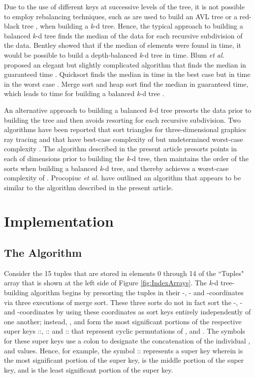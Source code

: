 \documentclass{sig-alternate}
\begin{document}
Due to the use of different keys at successive levels of the tree, it is not possible to employ rebalancing techniques, such as are used to build an AVL tree \cite{Adelson} or a red-black tree \cite{Bayer,Guibas}, when building a \emph{k}-d tree.  Hence, the typical approach to building a balanced \emph{k}-d tree finds the median of the data for each recursive subdivision of the data.  Bentley showed that if the median of  elements were found in  time, it would be possible to build a depth-balanced \emph{k}-d tree in  time.  Blum \emph{et al.} proposed an elegant but slightly complicated algorithm that finds the median in guaranteed  time \cite{Blum}.  Quicksort \cite{Hoare} finds the median in  time in the best case but in  time in the worst case \cite{Wirth}. Merge sort \cite{Neumann} and heap sort \cite{Williams} find the median in guaranteed  time, which leads to  time for building a balanced \emph{k}-d tree \cite{Wald}.

An alternative approach to building a balanced \emph{k}-d tree presorts the data prior to building the tree and then avoids resorting for each recursive subdivision.  Two algorithms have been reported that sort triangles for three-dimensional graphics ray tracing and that have best-case complexity of  but undetermined worst-case complexity \cite{Havran,Wald}.  The algorithm described in the present article presorts points in each of  dimensions prior to building the \emph{k}-d tree, then maintains the order of the  sorts when building a balanced \emph{k}-d tree, and thereby achieves a worst-case complexity of .  Procopiuc \emph{et al.} have outlined an algorithm \cite{Procopiuc} that appears to be similar to the algorithm described in the present article.


\section{Implementation}
\subsection{The  Algorithm}
\label{sec:knlogn_algorithm}

Consider the 15  tuples that are stored in elements 0 through 14 of the ``Tuples" array that is shown at the left side of Figure \ref{fig:IndexArrays}.  The \emph{k}-d tree-building algorithm begins by presorting the tuples in their -, - and -coordinates via three executions of merge sort.  These three sorts do not in fact sort the -, - and -coordinates by using these coordinates as sort keys entirely independently of one another; instead, ,  and  form the most significant portions of the respective super keys ::, :: and :: that represent cyclic permutations of ,  and .  The symbols for these super keys use a colon to designate the concatenation of the individual ,  and  values.  Hence, for example, the symbol :: represents a super key wherein  is the most significant portion of the super key,  is the middle portion of the super key, and  is the least significant portion of the super key.
\end{document}
